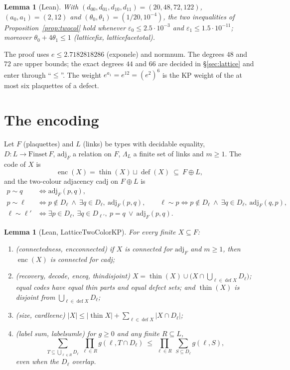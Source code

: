\documentclass[11pt,a4paper]{article}
\newtheorem{lemma}[theorem]{Lemma}
\theoremstyle{definition}
\theoremstyle{remark}
\DeclareRobustCommand{\lean}[1]{{\ttfamily\renewcommand{\_}{\textunderscore\allowbreak}#1}}
\newcommand{\thin}{\operatorname{thin}}
\newcommand{\dfc}{\operatorname{def}}
\newcommand{\enc}{\operatorname{enc}}
\begin{document}
\begin{lemma}[Lean]\label{lem:fix}
With $(d_{00},d_{01},d_{10},d_{11})=(20,48,72,122)$, $(a_0,a_1)=(2,12)$ and $(\theta_0,\theta_1)=(1/20,10^{-4})$, the two inequalities of Proposition~\ref{prop:twocol} hold whenever $\varepsilon_0\le2.5\cdot10^{-3}$ and $\varepsilon_1\le1.5\cdot10^{-11}$; moreover $\theta_0+4\theta_1\le1$ (\lean{lattice\_fix}, \lean{lattice\_face\_total}).
\end{lemma}
The proof uses $e\le2.7182818286$ (\lean{exp\_one\_le}) and \lean{norm\_num}. The degrees $48$ and $72$ are upper bounds; the exact degrees $44$ and $66$ are decided in \S\ref{sec:lattice} and enter through ``$\le$''. The weight $e^{a_1}=e^{12}=(e^{2})^{6}$ is the KP weight of the at most six plaquettes of a defect.

\section{The encoding}\label{sec:encoding}

Let $F$ (plaquettes) and $L$ (links) be types with decidable equality, $D:L\to\mathrm{Finset}\,F$, $\mathrm{adj}_F$ a relation on $F$, $\Lambda_L$ a finite set of links and $m\ge1$. The code of $X$ is
\[
\enc(X)=\thin(X)\sqcup\dfc(X)\ \subseteq\ F\oplus L ,
\]
and the two-colour adjacency \lean{cadj} on $F\oplus L$ is
\begin{align*}
p\sim q &\iff \mathrm{adj}_F(p,q),\\
p\sim\ell &\iff p\notin D_\ell\ \wedge\ \exists q\in D_\ell,\ \mathrm{adj}_F(p,q),\qquad
\ell\sim p \iff p\notin D_\ell\ \wedge\ \exists q\in D_\ell,\ \mathrm{adj}_F(q,p),\\
\ell\sim\ell' &\iff \exists p\in D_\ell,\ \exists q\in D_{\ell'},\ p=q\ \vee\ \mathrm{adj}_F(p,q).
\end{align*}

\begin{lemma}[Lean, \lean{LatticeTwoColorKP}]\label{lem:enc}
For every finite $X\subseteq F$:
\begin{enumerate}[label=(\roman*),leftmargin=2em]
\item (\emph{connectedness}, \lean{enc\_connected}) if $X$ is connected for $\mathrm{adj}_F$ and $m\ge1$, then $\enc(X)$ is connected for \lean{cadj};
\item (\emph{recovery}, \lean{decode}, \lean{enc\_eq}, \lean{thin\_disjoint}) $X=\thin(X)\cup\bigl(X\cap\bigcup_{\ell\in\dfc X}D_\ell\bigr)$; equal codes have equal thin parts and equal defect sets; and $\thin(X)$ is disjoint from $\bigcup_{\ell\in\dfc X}D_\ell$;
\item (\emph{size}, \lean{card\_le\_enc}) $|X|\le|\thin X|+\sum_{\ell\in\dfc X}|X\cap D_\ell|$;
\item (\emph{label sum}, \lean{label\_sum\_le}) for $g\ge0$ and any finite $R\subseteq L$,
\[
\sum_{T\subseteq\bigcup_{\ell\in R}D_\ell}\ \prod_{\ell\in R}g(\ell,T\cap D_\ell)\ \le\ \prod_{\ell\in R}\ \sum_{S\subseteq D_\ell}g(\ell,S),
\]
even when the $D_\ell$ overlap.
\end{enumerate}
\end{lemma}
\end{document}
